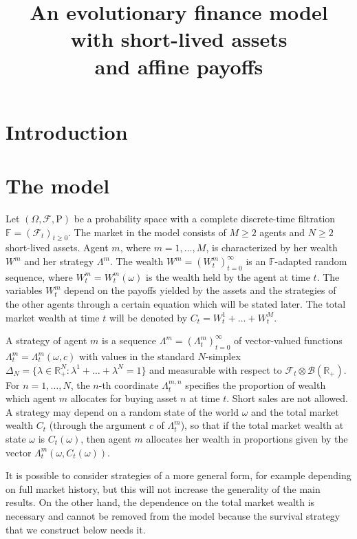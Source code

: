 \documentclass[a4paper,11pt,english]{article}
\title{An evolutionary finance model with short-lived assets\\ and
affine payoffs}
\author{}
\date{}
\theoremstyle{definition}
\renewcommand{\P}{\mathrm{P}}
\newcommand{\F}{\mathcal{F}}
\newcommand{\R}{\mathbb{R}}
\begin{document}
\maketitle

\section{Introduction}

\section{The model}

Let $(\Omega,\F,\P)$ be a probability space with a complete discrete-time
 filtration $\mathbb{F} = (\F_t)_{t\ge 0}$.
The market in the model consists of $M\ge 2$ agents and $N\ge 2$ short-lived assets. Agent
$m$, where $m=1,\ldots,M$, is  characterized by her wealth $W^m$ and her
strategy $\Lambda^m$. The wealth $W^m = (W_t^m)_{t=0}^\infty$ is an
$\mathbb{F}$-adapted random sequence, where $W_t^m=W_t^m(\omega)$ is the wealth
held by the agent at time $t$. The variables $W_t^m$  depend on the payoffs yielded by the assets and the
strategies of the other agents through a certain equation which will be
stated later. The total market wealth at time $t$ will be denoted by $C_t =
W_t^1+\ldots+W_t^M$. 

A strategy of agent $m$ is a sequence $\Lambda^m =
(\Lambda_t^m)_{t=0}^\infty$ of vector-valued functions $\Lambda_t^m =
\Lambda_t^m(\omega,c)$ with values in the standard $N$-simplex $\Delta_N
=\{\lambda \in \R^N_+ : \lambda^1+\ldots+\lambda^N = 1\}$ and measurable with
respect to $\F_t\otimes \mathcal{B}(\R_+)$. For $n=1,\ldots,N$, the $n$-th
coordinate $\Lambda_t^{m,n}$ specifies the proportion of wealth which agent
$m$ allocates for buying asset $n$ at time $t$. Short sales are not allowed.
A strategy may depend on a random state of the world $\omega$ and the total
market wealth $C_t$ (through the argument $c$ of $\Lambda_t^m$), so that if
the total market wealth at state $\omega$ is $C_t(\omega)$, then agent $m$
allocates her wealth in proportions given by the vector $\Lambda_t^m(\omega,
C_t(\omega))$.

It is possible to consider strategies of a more general form, for example
depending on full market history, but this will not increase the generality
of the main results. On the other hand, the dependence on the total market
wealth is necessary and cannot be removed from the model because the
survival strategy that we construct below needs it.
\end{document}
